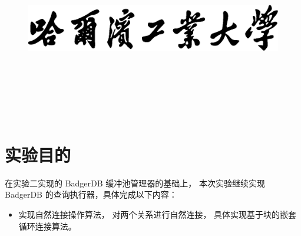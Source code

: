 \documentclass[12pt,onecolumn]{report}
\newcommand{\hei}{\CJKfamily{hei}}      %
\theoremstyle{plain}
\numberwithin{figure}{chapter}
\numberwithin{table}{chapter}
\numberwithin{lstlisting}{chapter}
\begin{document}
\begin{titlepage}
  \vspace{5\baselineskip}

  \begin{figure}[H]
    \centering
    \includegraphics[width=0.6\linewidth]{figures/school.eps}
  \end{figure}

  \centering\hei{}

  \xiaosan\vspace{\baselineskip}


  \erhao\vspace{2\baselineskip}


  \sanhao\vspace{3\baselineskip}

  ~~\underline{} \\ [24pt]
  ~~\underline{} \\ [24pt]
  ~~\underline{} \\ [24pt]
  ~~\underline{} \\ [24pt]
  ~~\underline{} \\ [24pt]
\end{titlepage}

\clearpage
\tableofcontents
\clearpage

\makeatletter
\patchcmd{\chapter}{\if@openright\cleardoublepage\else\clearpage\fi}{}{}{}
\makeatother

\chapter{实验目的}
在实验二实现的 BadgerDB 缓冲池管理器的基础上，
本次实验继续实现 BadgerDB 的查询执行器，具体完成以下内容：
\begin{itemize}[fullwidth,itemindent=\parindent]
\item
  实现自然连接操作算法，
  对两个关系进行自然连接，
  具体实现基于块的嵌套循环连接算法。
\end{itemize}
\end{document}
